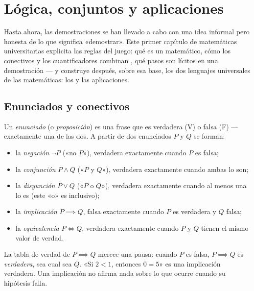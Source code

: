 \chapter{Lógica, conjuntos y aplicaciones}\label{ch:b1:logic}

Hasta ahora, las demostraciones se han llevado a cabo con una idea
informal pero honesta de lo que significa «demostrar». Este primer
capítulo de matemáticas universitarias explicita las reglas del juego:
qué es un  matemático, cómo los conectivos y los cuantificadores
combinan , qué pasos son lícitos en una demostración --- y
construye después, sobre esa base, los dos lenguajes universales de las
matemáticas: los  y las aplicaciones.

\section{Enunciados y conectivos}

\begin{definition}\label{def:b1:logic:statement}
Un \emph{enunciado} (o \emph{proposición}) es una frase
que es verdadera (V) o falsa (F) --- exactamente una de las dos. A
partir de dos enunciados $P$ y $Q$ se forman:
\begin{itemize}
  \item la \emph{negación} $\lnot P$ («no $P$»), verdadera exactamente
        cuando $P$ es falsa;
  \item la \emph{conjunción} $P \land Q$ («$P$ y $Q$»), verdadera
        exactamente cuando ambas lo son;
  \item la \emph{disyunción} $P \lor Q$ («$P$ o $Q$»), verdadera
        exactamente cuando al menos una lo es (este «o» es inclusivo);
  \item la \emph{implicación} $P \implies Q$, falsa exactamente cuando
        $P$ es verdadera y $Q$ falsa;
  \item la \emph{equivalencia} $P \iff Q$, verdadera exactamente cuando
        $P$ y $Q$ tienen el mismo valor de verdad.
\end{itemize}
\end{definition}

\begin{remark}
La tabla de verdad de $P \implies Q$ merece una pausa: cuando $P$ es
falsa, $P \implies Q$ es \emph{verdadera}, sea cual sea $Q$. «Si
$2 < 1$, entonces $0 = 5$» es una implicación verdadera. Una implicación
no afirma nada sobre lo que ocurre cuando su hipótesis falla.
\end{remark}

